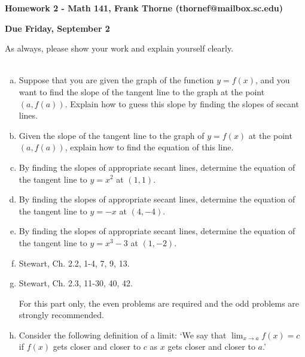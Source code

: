 \documentclass[12pt]{article}
\begin{document}
\setlength{\topmargin}{-2mm}





\begin{center}{\bf Homework 2 - Math 141, Frank Thorne (thornef@mailbox.sc.edu)}
\end{center}
\begin{center}
{\bf Due Friday, September 2}
\end{center}

As always, please show your work and explain yourself clearly. 
\\
\\
\begin{enumerate}[(a)]
\item
Suppose that you are given the graph of the function $y = f(x)$, and
you want to find the slope of the tangent line to the graph at the point
$(a, f(a))$. Explain how to guess this slope by
finding the slopes of secant lines.

\item
Given the slope of the tangent line to the graph of $y = f(x)$ at the point
$(a, f(a))$, explain how to find the equation of this line.

\item
By finding the slopes of appropriate secant lines, determine the equation
of the tangent line to $y = x^2$ at $(1, 1)$.

\item
By finding the slopes of appropriate secant lines, determine the equation
of the tangent line to $y = -x$ at $(4, -4)$.

\item
By finding the slopes of appropriate secant lines, determine the equation
of the tangent line to $y = x^3 - 3$ at $(1, -2)$.

\item
Stewart, Ch. 2.2, 1-4, 7, 9, 13.

\item
Stewart, Ch. 2.3, 11-30, 40, 42.

For this part only, the even problems are required and the odd problems
are strongly recommended.

\item
Consider the following definition of a limit: `We say that
$\lim_{x \rightarrow a} f(x) = c$ if $f(x)$ gets closer and closer to
$c$ as $x$ gets closer and closer to $a$.'


\end{enumerate}
\end{document}
